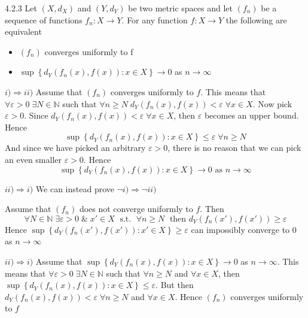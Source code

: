 \documentclass[a4paper,norsk]{article}
\renewcommand{\geq}{\geqslant}
\renewcommand{\leq}{\leqslant}
\renewcommand{\epsilon}{\varepsilon}
\begin{document}
\begin{propositionbox}{4.2.3}{}
Let $ \left( X, d_X \right)  $ and $ \left( Y, d_Y \right)  $ be two metric spaces and let $ \left( f_n \right)  $ be a sequence of functions $ f_n : X \to Y $. For any function $ f: X \to Y $ the following are equivalent
\begin{itemize}
  \item $ \left( f_n \right)  $ converges uniformly to f
  \item $ \sup \left\{ d_Y \left( f_n(x), f(x) \right) : x \in X  \right\} \to 0  $ as $ n \to \infty $ 
\end{itemize}

\begin{proofbox}{ $ i) \Rightarrow ii) $ }{}
  Assume that $ \left( f_n \right)  $ converges uniformly to $ f $. This means that $ \forall \epsilon > 0 \; \exists  N \in \mathbb{N} $ such that $ \forall n \geq N \; d_Y \left( f_n(x), f(x) \right) < \epsilon \; \forall x \in X $. Now pick $ \epsilon > 0 $. Since $ d_Y \left( f_n(x), f(x) \right) < \epsilon \; \forall x \in X $, then $ \epsilon  $ becomes an upper bound. Hence
  \[
      \sup \left\{ d_Y \left( f_n(x), f(x) \right) : x \in X \right\} \leq \epsilon \; \forall n \geq N
  \]
  And since we have picked an arbitrary $ \epsilon > 0 $, there is no reason that we can pick an even smaller $ \epsilon >0 $. Hence
  \[
      \sup \left\{ d_Y \left( f_n(x), f(x) \right) : x \in X \right\} \to 0 \text{ as } n \to \infty
  \]
  

\end{proofbox}
\begin{proofbox}{ $ ii) \Rightarrow i) $ }{}
  We can instead prove $ \neg i) \Rightarrow \neg ii) $
  
  Assume that $ \left( f_n \right)  $ does not converge uniformly to $ f $. Then 
  \[
      \forall N \in \mathbb{N} \; \exists \epsilon > 0 \; \&  \; x' \in X  \; \text{ s.t. } \; \forall  n\geq N \; \text{ then }  d_Y \left( f_n(x'), f(x') \right) \geq \epsilon  
  \]
  Hence $ \sup \left\{ d_Y \left( f_n(x'), f(x') \right) : x' \in X \right\} \geq \epsilon  $ can impossibly converge to $ 0 $  as $ n \to \infty $ 

  
\end{proofbox}

\begin{proofbox}{ $ ii) \Rightarrow i) $ }{}
  Assume that $ \sup \left\{ d_Y \left( f_n(x), f(x) \right) : x \in X \right\} \to 0  $ as $ n \to \infty $. This means that $ \forall \epsilon > 0 \; \exists N \in \mathbb{N} $   such that $ \forall n \geq N  $ and $ \forall x \in X $, then $ \sup \left\{ d_Y \left( f_n(x), f(x) \right) : x \in X \right\} \leq \epsilon   $. But then $ d_Y \left( f_n(x), f(x) \right) < \epsilon \; \forall n \geq N $ and $ \forall x \in X $. Hence $ \left( f_n \right)  $ converges uniformly to $ f $ 
\end{proofbox}
\end{propositionbox}
\end{document}
